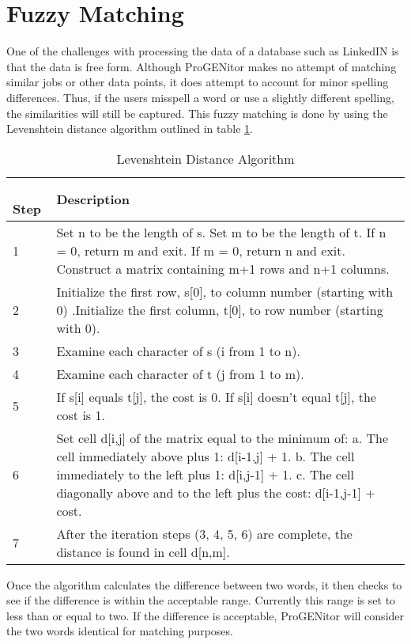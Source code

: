 \section{Fuzzy Matching}
\label{sect:fuzzy-matching}
One of the challenges with processing the data of a database such as LinkedIN is
that the data is free form.  Although ProGENitor makes no attempt of matching
similar jobs or other data points, it does attempt to account for minor spelling
differences.  Thus, if the users misspell a word or use a slightly different
spelling, the similarities will still be captured. This fuzzy matching is
done by using the Levenshtein distance algorithm\cite{fuzzy} outlined in table
\ref{tab:lev-dist}.  

\begin{table}[H]
  \centering
  \begin{tabular}{|p{.5in}|p{4in}|}
  \hline
  \
  Step & Description \\
  \hline\hline
  1 &  Set n to be the length of s.\newline 
  Set m to be the length of t.\newline
  If n = 0, return m and exit.\newline
  If m = 0, return n and exit.\newline
  Construct a matrix containing m+1 rows and n+1 columns.  \\ \hline 
  2 &  	Initialize the first row, s[0], to column number (starting with
  0) .\newline Initialize the first column, t[0], to row number (starting
  with 0).\\
  \hline 3 & Examine each character of s (i from 1 to n). \\ \hline 4 & Examine each character of t (j from 1 to m). \\ \hline
  5 &  	If s[i] equals t[j], the cost is 0.\newline
  If s[i] doesn't equal t[j], the cost is 1. \\\hline 
  6 &  	Set cell d[i,j] of the matrix equal to the minimum of:\newline
  a. The cell immediately above plus 1: d[i-1,j] + 1.\newline
  b. The cell immediately to the left plus 1: d[i,j-1] + 1.\newline
  c. The cell diagonally above and to the left plus the cost: d[i-1,j-1] + cost.\\ \hline
  7 & After the iteration steps (3, 4, 5, 6) are complete, the distance is found in cell d[n,m]. \\ \hline
  \end{tabular}
  \caption{Levenshtein Distance Algorithm}
  \label{tab:lev-dist}
\end{table}

Once the algorithm calculates the difference between two
words, it then checks to see if the difference is within the acceptable range. 
Currently this range is set to less than or equal to two.  If the difference is
acceptable, ProGENitor will consider the two words identical for matching
purposes.


